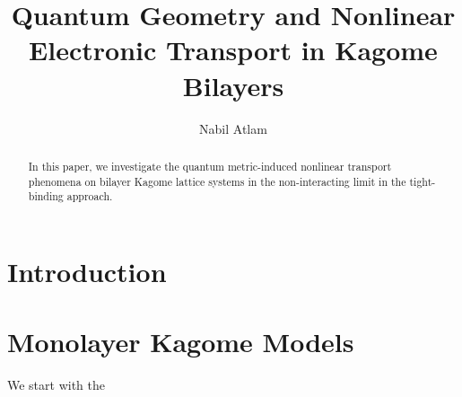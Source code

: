 \documentclass[reprint,aps,superscriptaddress]{revtex4-2}
\begin{document}
\title{
Quantum Geometry and Nonlinear Electronic Transport in Kagome Bilayers
}
\author{Nabil Atlam}




\begin{abstract}

In this paper, we investigate the quantum metric-induced nonlinear transport phenomena on bilayer Kagome lattice systems in the non-interacting limit in the tight-binding approach. 

\cite{tangHighTemperatureFractionalQuantum2011a}

\end{abstract}

\maketitle

\section{Introduction}

\section{Monolayer Kagome Models}

We start with the 



\end{document}
